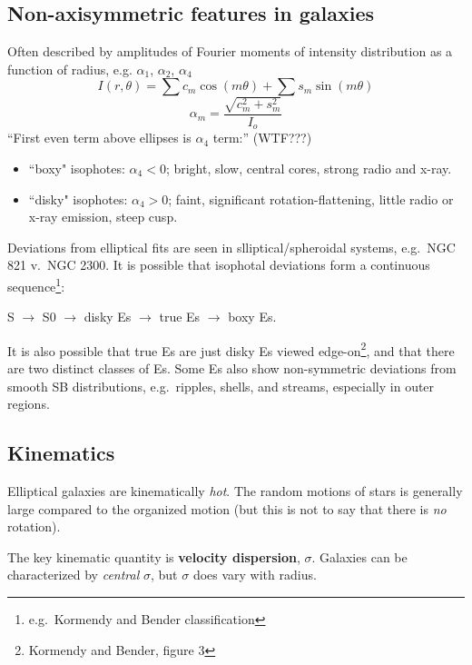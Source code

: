 \documentclass{article}
\newcommand{\mynotes}[1]{\textcolor{cadmiumorange}{#1}}
\begin{document}
\subsection{Non-axisymmetric features in galaxies}
Often described by amplitudes of Fourier moments of
intensity distribution as a function of radius, e.g.
$\alpha_1$, $\alpha_2$, $\alpha_4$
\[
    I\left(r,\theta\right) = \sum{c_{m}\cos\left(m\theta\right)} +
    \sum{s_{m}\sin\left(m\theta\right)}
\]\[
    \alpha_{m} = \frac{\sqrt{c^{2}_{m} + s_{m}^{2}}}{I_{o}}
\]
``First even term above ellipses is $\alpha_4$ term:'' \mynotes{(WTF???)}
\begin{itemize}
    \item ``boxy" isophotes: $\alpha_4 < 0$;
        bright, slow, central cores, strong radio and x-ray.
    \item ``disky" isophotes: $\alpha_4 > 0$;
        faint, significant rotation-flattening, little
        radio or x-ray emission, steep cusp.
\end{itemize}
Deviations from elliptical fits are seen in slliptical/spheroidal systems,
e.g.\ NGC 821 v.\ NGC 2300. It is possible that isophotal deviations form
a continuous sequence\footnote{e.g.\ Kormendy and Bender classification}:
\begin{center}
S $\rightarrow$ S0 $\rightarrow$ disky Es $\rightarrow$ true Es $\rightarrow$ boxy Es.
\end{center}
It is also possible that true Es are just disky Es viewed
edge-on\footnote{Kormendy and Bender, figure 3}, and that there are two
distinct classes of Es. Some Es also show non-symmetric deviations from
smooth SB distributions, e.g.\ ripples, shells, and streams, especially
in outer regions.

\subsection{Kinematics}
Elliptical galaxies are kinematically \emph{hot}. The random motions of stars
is generally large compared to the organized motion (but this is not to say
that there is \emph{no} rotation).

The key kinematic quantity is \textbf{velocity dispersion}, $\sigma$.  Galaxies
can be characterized by \emph{central} $\sigma$, but $\sigma$ does vary with
radius.
\end{document}
